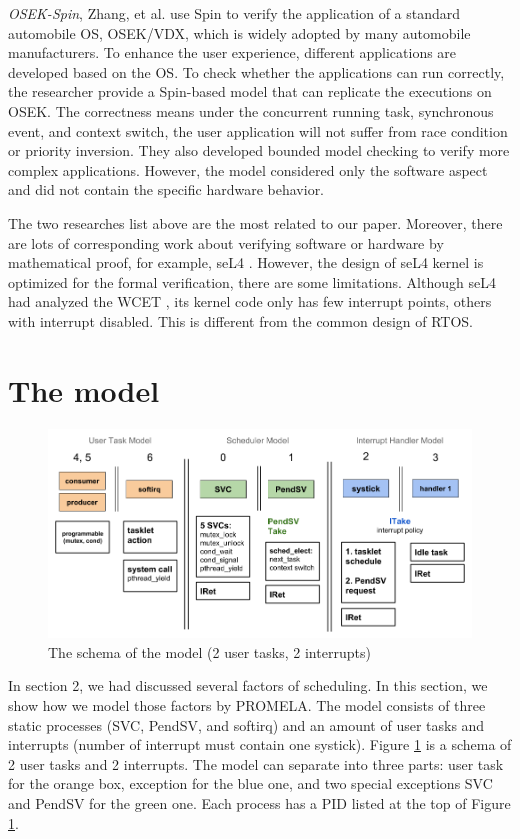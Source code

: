 \textit{OSEK-Spin}, Zhang, et al. \cite{10.1007/978-3-319-17581-2_16} use Spin to verify the application of a standard automobile OS, OSEK/VDX, which is widely adopted by many automobile manufacturers. To enhance the user experience, different applications are developed based on the OS. To check whether the applications can run correctly, the researcher provide a Spin-based model that can replicate the executions on OSEK. The correctness means under the concurrent running task, synchronous event, and context switch, the user application will not suffer from race condition or priority inversion. They also developed bounded model checking to verify more complex applications. However, the model considered only the software aspect and did not contain the specific hardware behavior.

The two researches list above are the most related to our paper. Moreover, there are lots of corresponding work about verifying software or hardware by mathematical proof, for example, seL4 \cite{Klein:2009:SFV:1629575.1629596}. However, the design of seL4 kernel is optimized for the formal verification, there are some limitations. Although seL4 had analyzed the WCET \cite{6121451}, its kernel code only has few interrupt points, others with interrupt disabled. This is different from the common design of RTOS.

\section{The model}

\begin{figure}
\includegraphics[width=0.7\linewidth]{img/model}
\caption{The schema of the model (2 user tasks, 2 interrupts)}
\label{fig:model}
\end{figure}

In section 2, we had discussed several factors of scheduling. In this section, we show how we model those factors by PROMELA. The model consists of three static processes (SVC, PendSV, and softirq) and an amount of user tasks and interrupts (number of interrupt must contain one systick). Figure \ref{fig:model} is a schema of 2 user tasks and 2 interrupts. The model can separate into three parts: user task for the orange box, exception for the blue one, and two special exceptions SVC and PendSV for the green one. Each process has a PID listed at the top of Figure \ref{fig:model}.

